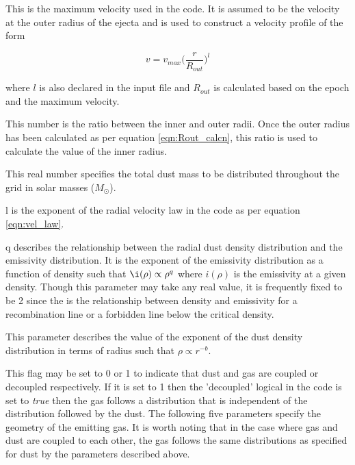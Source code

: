 This is the maximum velocity used in the code.  It is assumed to be the velocity at the outer radius of the ejecta and is used to construct a velocity profile of the form

\begin{equation}
	v = v_{max} \Big( \frac{r}{R_{out}} \Big)^l
	\label{eqn:vel_law}
\end{equation}

where $l$ is also declared in the input file and $R_{out}$ is calculated based on the epoch and the maximum velocity.


This number is the ratio between the inner and outer radii.  Once the outer radius has been calculated as per equation \ref{eqn:Rout_calcn}, this ratio is used to calculate the value of the inner radius.


This real number specifies the total dust mass to be distributed throughout the grid in solar masses ($M_{\odot}$).


l is the exponent of the radial velocity law in the code as per equation \ref{eqn:vel_law}.


q describes the relationship between the radial dust density distribution and the emissivity distribution.  It is the exponent of the emissivity distribution as a function of density such that $\i(\rho) \propto \rho^q$ where $i(\rho)$ is the emissivity at a given density.  Though this parameter may take any real value, it is frequently fixed to be 2 since the is the relationship between density and emissivity for a recombination line or a forbidden line below %
the critical density.


This parameter describes the value of the exponent of the dust density distribution in terms of radius such that $\rho \propto r^{-b}$.


This flag may be set to 0 or 1 to indicate that dust and gas are coupled or decoupled respectively.  If it is set to 1 then the 'decoupled' logical in the code is set to \textit{true} then the gas follows a distribution that is independent of the distribution followed by the dust.  The following five parameters specify the geometry of the emitting gas.  It is worth noting that in the case where gas and dust are coupled to each other, the gas follows the same distributions as specified for dust by the parameters described above. 

